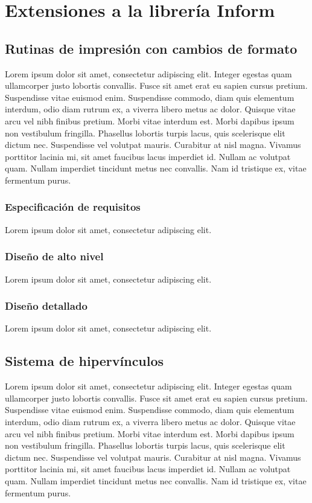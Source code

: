 
\chapter{Extensiones a la librería Inform}\label{ch:extensiones}

\section{Rutinas de impresión con cambios de formato}

Lorem ipsum dolor sit amet, consectetur adipiscing elit. Integer egestas quam ullamcorper justo lobortis convallis. Fusce sit amet erat eu sapien cursus pretium. Suspendisse vitae euismod enim. Suspendisse commodo, diam quis elementum interdum, odio diam rutrum ex, a viverra libero metus ac dolor. Quisque vitae arcu vel nibh finibus pretium. Morbi vitae interdum est. Morbi dapibus ipsum non vestibulum fringilla. Phasellus lobortis turpis lacus, quis scelerisque elit dictum nec. Suspendisse vel volutpat mauris. Curabitur at nisl magna. Vivamus porttitor lacinia mi, sit amet faucibus lacus imperdiet id. Nullam ac volutpat quam. Nullam imperdiet tincidunt metus nec convallis. Nam id tristique ex, vitae fermentum purus.

\subsection{Especificación de requisitos}

Lorem ipsum dolor sit amet, consectetur adipiscing elit.

\subsection{Diseño de alto nivel}

Lorem ipsum dolor sit amet, consectetur adipiscing elit.

\subsection{Diseño detallado}

Lorem ipsum dolor sit amet, consectetur adipiscing elit.

\section{Sistema de hipervínculos}

Lorem ipsum dolor sit amet, consectetur adipiscing elit. Integer egestas quam ullamcorper justo lobortis convallis. Fusce sit amet erat eu sapien cursus pretium. Suspendisse vitae euismod enim. Suspendisse commodo, diam quis elementum interdum, odio diam rutrum ex, a viverra libero metus ac dolor. Quisque vitae arcu vel nibh finibus pretium. Morbi vitae interdum est. Morbi dapibus ipsum non vestibulum fringilla. Phasellus lobortis turpis lacus, quis scelerisque elit dictum nec. Suspendisse vel volutpat mauris. Curabitur at nisl magna. Vivamus porttitor lacinia mi, sit amet faucibus lacus imperdiet id. Nullam ac volutpat quam. Nullam imperdiet tincidunt metus nec convallis. Nam id tristique ex, vitae fermentum purus.

